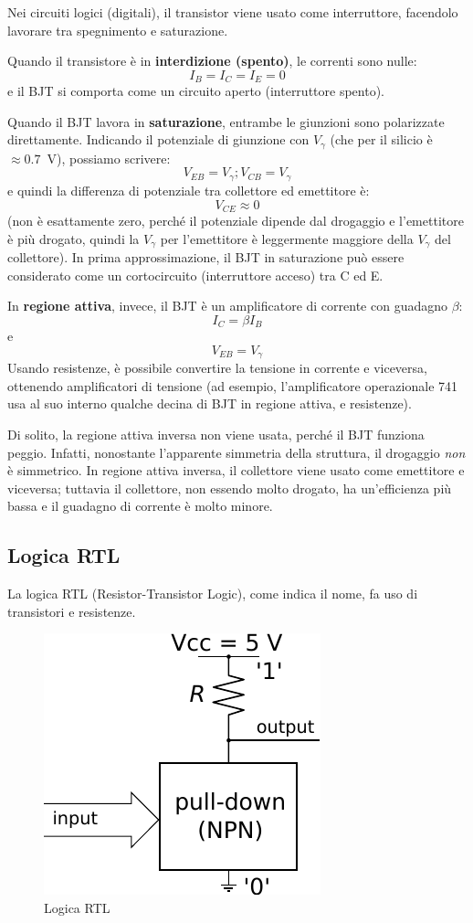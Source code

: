\documentclass[10pt,a4paper,twoside,twocolumn]{article}
\begin{document}
Nei circuiti logici (digitali), il transistor viene usato come interruttore, facendolo lavorare tra spegnimento e saturazione.

Quando il transistore \`e in \textbf{interdizione (spento)}, le correnti sono nulle:
\[
I_B = I_C = I_E = 0
\]
e il BJT si comporta come un circuito aperto (interruttore spento).

Quando il BJT lavora in  \textbf{saturazione}, entrambe le giunzioni sono polarizzate direttamente.
Indicando il potenziale di giunzione con $V_\gamma$ (che per il silicio \`e $\approx 0.7$~V), possiamo scrivere:
\[
V_{EB} = V_\gamma; V_{CB} = V_\gamma
\]
e quindi la differenza di potenziale tra collettore ed emettitore \`e:
\[
V_{CE} \approx 0
\]
(non  \`e esattamente zero, perch\'e il potenziale dipende dal drogaggio e l'emettitore \`e pi\`u drogato, quindi la $V_\gamma$ per l'emettitore \`e leggermente maggiore della $V_\gamma$ del collettore).
In prima approssimazione, il BJT in saturazione pu\`o essere considerato come un cortocircuito (interruttore acceso) tra C ed E.

In \textbf{regione attiva}, invece, il BJT \`e un amplificatore di corrente con guadagno $\beta$:
\[
I_C = \beta I_B
\]
e
\[
V_{EB} = V_\gamma
\]
Usando resistenze, \` e possibile convertire la tensione in corrente e viceversa, ottenendo amplificatori di tensione (ad esempio, l'amplificatore operazionale 741 usa al suo interno qualche decina di BJT in regione attiva, e resistenze).

Di solito, la regione attiva inversa non viene usata, perch\'e il BJT funziona peggio.
Infatti, nonostante l'apparente simmetria della struttura, il drogaggio \emph{non} \`e simmetrico.
In regione attiva inversa, il collettore viene usato come emettitore e viceversa; tuttavia il collettore, non essendo molto drogato, ha un'efficienza pi\`u bassa e il guadagno di corrente \`e molto minore.



\subsection{Logica RTL}
La logica RTL (Resistor-Transistor Logic), come indica il nome, fa uso di transistori e resistenze.
\begin{figure}[t]
\centering
\includegraphics[width=0.4\columnwidth]{logic1.pdf}
\caption{Logica RTL}
\label{logic1}
\end{figure}
\end{document}
